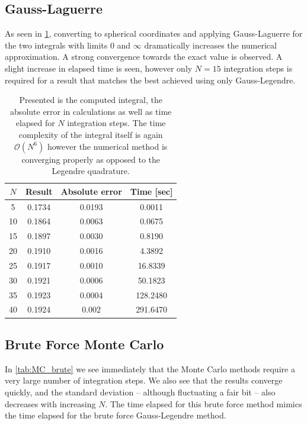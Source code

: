 \documentclass[intlimits]{amsart}
\begin{document}
\subsection{Gauss-Laguerre}
\label{sub:gauss_laguerre}
As seen in \cref{tab:laguerre}, converting to spherical coordinates and
applying Gauss-Laguerre for the two integrals with limits $0$ and $\infty$
dramatically increases the numerical approximation. A strong convergence
towards the exact value is observed. A slight increase in elapsed time is seen,
however only $N = 15$ integration steps is required for a result that matches
the best achieved using only Gauss-Legendre.
\begin{table}[p]
  \centering
  \caption{Presented is the computed integral, the absolute error in calculations
  as well as time elapsed for $N$ integration steps. The time complexity of the
  integral itself is again $\mathcal{O}(N^6)$ however the numerical method is
  converging properly as opposed to the Legendre quadrature.}
  \label{tab:laguerre}
  \begin{tabular}{cccc}
    $N$ & Result & Absolute error & Time [sec]\\
    \hline
    \hline
    5& 0.1734& 0.0193& 0.0011\\
    10& 0.1864& 0.0063& 0.0675\\
    15& 0.1897& 0.0030& 0.8190\\
    20& 0.1910& 0.0016& 4.3892\\
    25& 0.1917& 0.0010& 16.8339\\
    30& 0.1921& 0.0006& 50.1823\\
    35& 0.1923& 0.0004& 128.2480\\
    40& 0.1924&0.002&291.6470\\
    \hline
  \end{tabular}
\end{table}

\subsection{Brute Force Monte Carlo}
\label{sub:brute_force_monte_carlo}

In \cref{tab:MC_brute} we see immediately that the Monte Carlo methods require
a very large number of integration steps. We also see that the results converge
quickly, and the standard deviation -- although fluctuating a fair bit -- also
decreases with increasing $N$. The time elapsed for this brute force method
mimics the time elapsed for the brute force Gauss-Legendre method.
\end{document}
